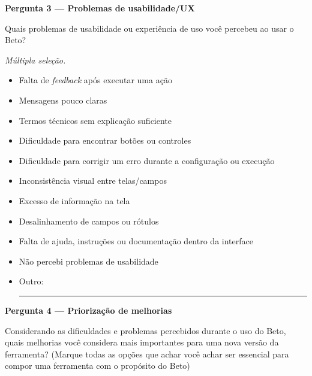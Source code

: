 \textbf{Pergunta 3 --- Problemas de usabilidade/UX}\par
Quais problemas de usabilidade ou experiência de uso você percebeu ao usar o Beto?

\emph{Múltipla seleção.}
\begin{itemize}[label=\caixaOpcao]
\item Falta de \textit{feedback} após executar uma ação
\item Mensagens pouco claras
\item Termos técnicos sem explicação suficiente
\item Dificuldade para encontrar botões ou controles
\item Dificuldade para corrigir um erro durante a configuração ou execução
\item Inconsistência visual entre telas/campos
\item Excesso de informação na tela
\item Desalinhamento de campos ou rótulos
\item Falta de ajuda, instruções ou documentação dentro da interface
\item Não percebi problemas de usabilidade
\item Outro: \rule{.65\linewidth}{.3pt}
\end{itemize}

\textbf{Pergunta 4 --- Priorização de melhorias}\par
Considerando as dificuldades e problemas percebidos durante o uso do Beto, quais melhorias você considera mais importantes para uma nova versão da ferramenta? (Marque todas as opções que achar você achar ser essencial para compor uma ferramenta com o propósito do Beto)

